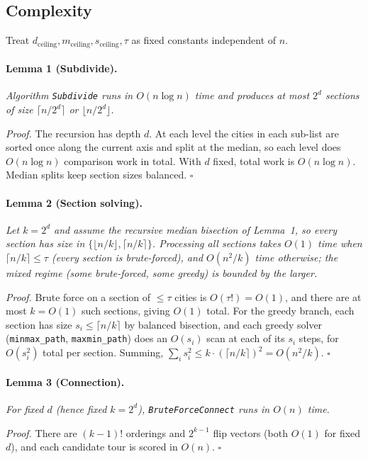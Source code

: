 \documentclass[11pt,a4paper]{article}
\begin{document}
\subsection{Complexity}

Treat $d_{\text{ceiling}}, m_{\text{ceiling}}, s_{\text{ceiling}}, \tau$
as fixed constants independent of $n$.

\paragraph{Lemma 1 (Subdivide).} \textit{Algorithm \texttt{Subdivide}
runs in $O(n \log n)$ time and produces at most $2^d$ sections of size
$\lceil n/2^d \rceil$ or $\lfloor n/2^d \rfloor$.}

\textit{Proof.} The recursion has depth $d$. At each level the cities
in each sub-list are sorted once along the current axis and split at
the median, so each level does $O(n \log n)$ comparison work in total.
With $d$ fixed, total work is $O(n \log n)$. Median splits keep section
sizes balanced. $\square$

\paragraph{Lemma 2 (Section solving).} \textit{Let $k = 2^d$ and assume
the recursive median bisection of Lemma~1, so every section has size in
$\{\lfloor n/k \rfloor, \lceil n/k \rceil\}$. Processing all sections
takes $O(1)$ time when $\lceil n/k \rceil \leq \tau$ (every section is
brute-forced), and $O(n^2 / k)$ time otherwise; the mixed regime
(some brute-forced, some greedy) is bounded by the larger.}

\textit{Proof.} Brute force on a section of $\leq \tau$ cities is
$O(\tau!) = O(1)$, and there are at most $k = O(1)$ such sections,
giving $O(1)$ total. For the greedy branch, each section has size
$s_i \leq \lceil n/k \rceil$ by balanced bisection, and each greedy
solver (\texttt{minmax\_path}, \texttt{maxmin\_path}) does an
$O(s_i)$ scan at each of its $s_i$ steps, for $O(s_i^2)$ total per
section. Summing, $\sum_i s_i^2 \leq k \cdot (\lceil n/k \rceil)^2 =
O(n^2/k)$. $\square$

\paragraph{Lemma 3 (Connection).} \textit{For fixed $d$ (hence fixed
$k = 2^d$), \texttt{BruteForceConnect} runs in $O(n)$ time.}

\textit{Proof.} There are $(k-1)!$ orderings and $2^{k-1}$ flip vectors
(both $O(1)$ for fixed $d$), and each candidate tour is scored in
$O(n)$. $\square$
\end{document}
